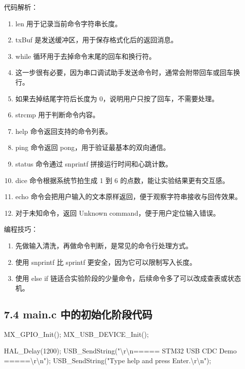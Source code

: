 \documentclass[
  chinese,
  UTF8,
  oneside,
  openany]{ctexbook}
\newenvironment{Shaded}{}{}
\newcommand{\DecValTok}[1]{\textcolor[rgb]{0.25,0.63,0.44}{#1}}
\newcommand{\NormalTok}[1]{#1}
\newcommand{\OperatorTok}[1]{\textcolor[rgb]{0.40,0.40,0.40}{#1}}
\newcommand{\SpecialCharTok}[1]{\textcolor[rgb]{0.25,0.44,0.63}{#1}}
\newcommand{\StringTok}[1]{\textcolor[rgb]{0.25,0.44,0.63}{#1}}
\providecommand{\tightlist}{%
  \setlength{\itemsep}{0pt}\setlength{\parskip}{0pt}}
\begin{document}
代码解析：

\begin{enumerate}
\def\labelenumi{\arabic{enumi}.}
\tightlist
\item
  len 用于记录当前命令字符串长度。
\item
  txBuf 是发送缓冲区，用于保存格式化后的返回消息。
\item
  while 循环用于去掉命令末尾的回车和换行符。
\item
  这一步很有必要，因为串口调试助手发送命令时，通常会附带回车或回车换行。
\item
  如果去掉结尾字符后长度为 0，说明用户只按了回车，不需要处理。
\item
  strcmp 用于判断命令内容。
\item
  help 命令返回支持的命令列表。
\item
  ping 命令返回 pong，用于验证最基本的双向通信。
\item
  status 命令通过 snprintf 拼接运行时间和心跳计数。
\item
  dice 命令根据系统节拍生成 1 到 6 的点数，能让实验结果更有交互感。
\item
  echo 命令会把用户输入的文本原样返回，便于观察字符串接收与回传效果。
\item
  对于未知命令，返回 Unknown command，便于用户定位输入错误。
\end{enumerate}

编程技巧：

\begin{enumerate}
\def\labelenumi{\arabic{enumi}.}
\tightlist
\item
  先做输入清洗，再做命令判断，是常见的命令行处理方式。
\item
  使用 snprintf 比 sprintf 更安全，因为它可以限制写入长度。
\item
  使用 else if
  链适合实验阶段的少量命令，后续命令多了可以改成查表或状态机。
\end{enumerate}

\subsection{7.4 main.c
中的初始化阶段代码}\label{main.c-ux4e2dux7684ux521dux59cbux5316ux9636ux6bb5ux4ee3ux7801}

\begin{Shaded}
\begin{Highlighting}[]
\NormalTok{MX\_GPIO\_Init}\OperatorTok{();}
\NormalTok{MX\_USB\_DEVICE\_Init}\OperatorTok{();}

\NormalTok{HAL\_Delay}\OperatorTok{(}\DecValTok{1200}\OperatorTok{);}
\NormalTok{USB\_SendString}\OperatorTok{(}\StringTok{"}\SpecialCharTok{\textbackslash{}r\textbackslash{}n}\StringTok{===== STM32 USB CDC Demo =====}\SpecialCharTok{\textbackslash{}r\textbackslash{}n}\StringTok{"}\OperatorTok{);}
\NormalTok{USB\_SendString}\OperatorTok{(}\StringTok{"Type \textquotesingle{}help\textquotesingle{} and press Enter.}\SpecialCharTok{\textbackslash{}r\textbackslash{}n}\StringTok{"}\OperatorTok{);}
\end{Highlighting}
\end{Shaded}
\end{document}

